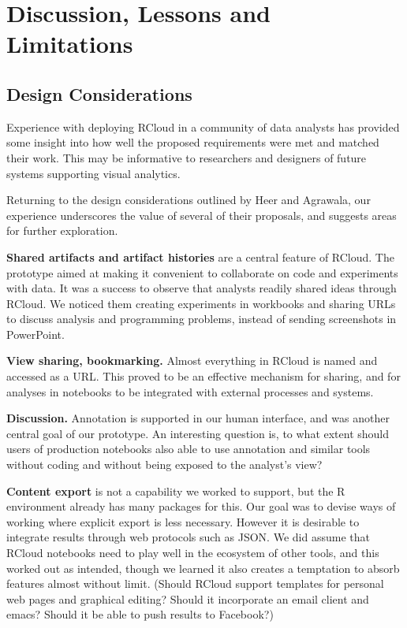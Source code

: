 \section{Discussion, Lessons and Limitations}

\subsection{Design Considerations}

Experience with deploying RCloud in a community of data analysts
has provided some insight into how well the proposed requirements
were met and matched their work. This may be informative to
researchers and designers of future systems supporting visual analytics.

Returning to the design considerations outlined by Heer and Agrawala,
our experience underscores the value of several of their proposals,
and suggests areas for further exploration.

{\bf Shared artifacts and artifact histories} are a central feature
of RCloud. The prototype aimed at making it convenient to collaborate
on code and experiments with data. It was a success to observe that analysts
readily shared ideas through RCloud. We noticed them creating experiments
in workbooks and sharing URLs to discuss analysis and programming
problems, instead of sending screenshots in PowerPoint.

{\bf View sharing, bookmarking.} Almost everything in RCloud is named
and accessed as a URL. This proved to be an effective mechanism
for sharing, and for analyses in notebooks to be integrated with
external processes and systems.

{\bf Discussion.} Annotation is supported in our human interface,
and was another central goal of our prototype. 
An interesting question is, to what extent should users of production
notebooks also able to use annotation and similar tools without coding
and without being exposed to the analyst's view?

{\bf Content export} is not a capability we worked to support,
but the R environment already has many packages for this.
Our goal was to devise ways of working where explicit export
is less necessary. However it is desirable to integrate results
through web protocols such as JSON. We did assume that RCloud
notebooks need to play well in the ecosystem of other tools,
and this worked out as intended, though we learned it also creates
a temptation to absorb features almost without limit. (Should
RCloud support templates for personal web pages and graphical
editing? Should it incorporate an email client and emacs?
Should it be able to push results to Facebook?)

